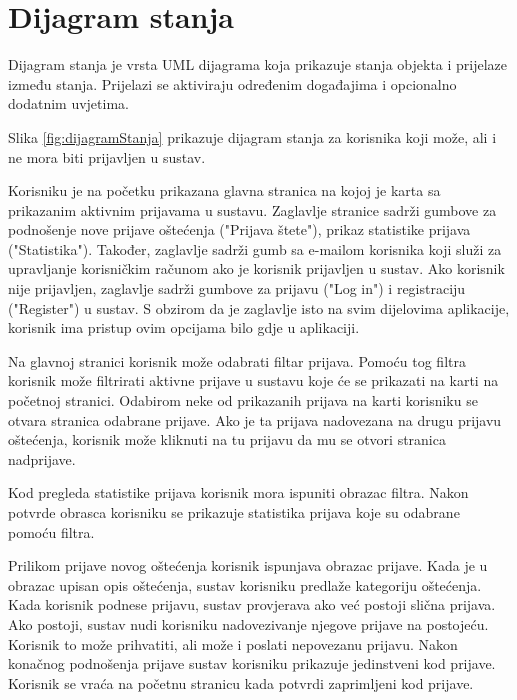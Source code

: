 			\eject
			
			
			\section{Dijagram stanja}
			
			Dijagram stanja je vrsta UML dijagrama koja prikazuje stanja objekta i prijelaze između stanja. Prijelazi se aktiviraju određenim događajima i opcionalno dodatnim uvjetima. 
			
			Slika \ref{fig:dijagramStanja} prikazuje dijagram stanja za korisnika koji može, ali i ne mora biti prijavljen u sustav. 
			
			Korisniku je na početku prikazana glavna stranica na kojoj je karta sa prikazanim aktivnim prijavama u sustavu. Zaglavlje stranice sadrži gumbove za podnošenje nove prijave oštećenja ("Prijava štete"), prikaz statistike prijava ("Statistika"). Također, zaglavlje sadrži gumb sa e-mailom korisnika koji služi za upravljanje korisničkim računom ako je korisnik prijavljen u sustav. Ako korisnik nije prijavljen, zaglavlje sadrži gumbove za prijavu ("Log in") i registraciju ("Register") u  sustav. S obzirom da je zaglavlje isto na svim dijelovima aplikacije, korisnik ima pristup ovim opcijama bilo gdje u aplikaciji.
			
			Na glavnoj stranici korisnik može odabrati filtar prijava. Pomoću tog filtra korisnik može filtrirati aktivne prijave u sustavu koje će se prikazati na karti na početnoj stranici. Odabirom neke od prikazanih prijava na karti korisniku se otvara stranica odabrane prijave. Ako je ta prijava nadovezana na drugu prijavu oštećenja, korisnik može kliknuti na tu prijavu da mu se otvori stranica nadprijave.
			
			Kod pregleda statistike prijava korisnik mora ispuniti obrazac filtra. Nakon potvrde obrasca korisniku se prikazuje statistika prijava koje su odabrane pomoću filtra. 
			
			Prilikom prijave novog oštećenja korisnik ispunjava obrazac prijave. Kada je u obrazac upisan opis oštećenja, sustav korisniku predlaže kategoriju oštećenja. Kada korisnik podnese prijavu, sustav provjerava ako već postoji slična prijava. Ako postoji, sustav nudi korisniku nadovezivanje njegove prijave na postojeću. Korisnik to može prihvatiti, ali može i poslati nepovezanu prijavu. Nakon konačnog podnošenja prijave sustav korisniku prikazuje jedinstveni kod prijave. Korisnik se vraća na početnu stranicu kada potvrdi zaprimljeni kod prijave.
			
